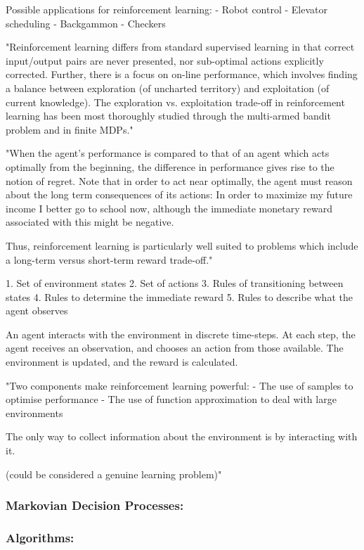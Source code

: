 \documentclass[a4paper,oneside]{report}
\begin{document}
Possible applications for reinforcement learning:
-	Robot control
-	Elevator scheduling
-	Backgammon
-	Checkers

"Reinforcement learning differs from standard supervised learning in that correct input/output pairs are never presented, nor sub-optimal actions explicitly corrected. Further, there is a focus on on-line performance, which involves finding a balance between exploration (of uncharted territory) and exploitation (of current knowledge). The exploration vs. exploitation trade-off in reinforcement learning has been most thoroughly studied through the multi-armed bandit problem and in finite MDPs."

"When the agent's performance is compared to that of an agent which acts optimally from the beginning, the difference in performance gives rise to the notion of regret. Note that in order to act near optimally, the agent must reason about the long term consequences of its actions: In order to maximize my future income I better go to school now, although the immediate monetary reward associated with this might be negative.

Thus, reinforcement learning is particularly well suited to problems which include a long-term versus short-term reward trade-off."

1. Set of environment states
2. Set of actions
3. Rules of transitioning between states
4. Rules to determine the immediate reward
5. Rules to describe what the agent observes

An agent interacts with the environment in discrete time-steps. At each step, the agent receives an observation, and chooses an action from those available. The environment is updated, and the reward is calculated.

"Two components make reinforcement learning powerful: 
-	The use of samples to optimise performance 
-	The use of function approximation to deal with large environments

The only way to collect information about the environment is by interacting with it.

(could be considered a genuine learning problem)"

\subsubsection{Markovian Decision Processes:}

\subsubsection{Algorithms:}
\end{document}
